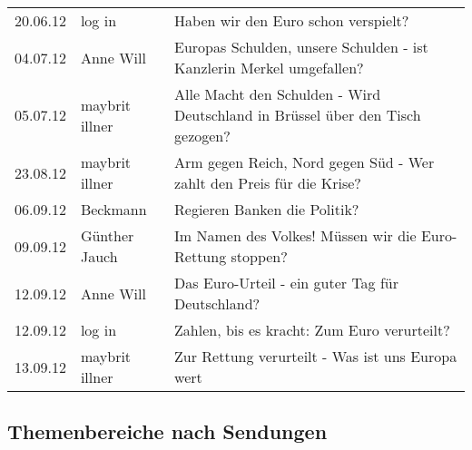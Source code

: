 \begin{table}[!htp]
{\begin{tabular}{@{}lll@{}}
			20.06.12       & log in                    & Haben wir den Euro schon verspielt?                                                      \\
			04.07.12       & Anne Will                 & Europas Schulden, unsere Schulden - ist Kanzlerin Merkel umgefallen?                     \\
			05.07.12       & maybrit illner            & Alle Macht den Schulden - Wird Deutschland in Brüssel über den Tisch gezogen?            \\
			23.08.12       & maybrit illner            & Arm gegen Reich, Nord gegen Süd - Wer zahlt den Preis für die Krise?                     \\
			06.09.12       & Beckmann                  & Regieren Banken die Politik?                                                             \\
			09.09.12       & Günther Jauch             & Im Namen des Volkes! Müssen wir die Euro-Rettung stoppen?                                \\
			12.09.12       & Anne Will                 & Das Euro-Urteil - ein guter Tag für Deutschland?                                         \\
			12.09.12       & log in                    & Zahlen, bis es kracht: Zum Euro verurteilt?                                              \\
			13.09.12       & maybrit illner            & Zur Rettung verurteilt -  Was ist uns Europa wert                                        \\ \bottomrule
		\end{tabular}%
	}
	\label{tab:anhang_folgen_eurokrise}
\end{table}

\pagebreak

\subsection{Themenbereiche nach Sendungen}

